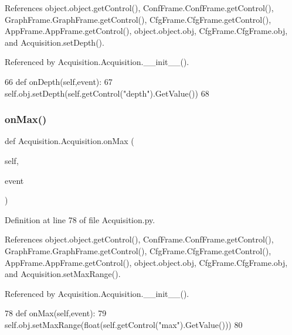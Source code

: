 References object.\+object.\+get\+Control(), Conf\+Frame.\+Conf\+Frame.\+get\+Control(), Graph\+Frame.\+Graph\+Frame.\+get\+Control(), Cfg\+Frame.\+Cfg\+Frame.\+get\+Control(), App\+Frame.\+App\+Frame.\+get\+Control(), object.\+object.\+obj, Cfg\+Frame.\+Cfg\+Frame.\+obj, and Acquisition.\+set\+Depth().



Referenced by Acquisition.\+Acquisition.\+\_\+\+\_\+init\+\_\+\+\_\+().


\begin{DoxyCode}
66     \textcolor{keyword}{def }onDepth(self,event):
67         self.obj.setDepth(self.getControl(\textcolor{stringliteral}{"depth"}).GetValue()) 
68 
\end{DoxyCode}
\mbox{\label{classAcquisition_1_1Acquisition_ad744ff797e84b6e5f785c24d44144697}} 
\subsubsection{\texorpdfstring{on\+Max()}{onMax()}}
{\footnotesize\ttfamily def Acquisition.\+Acquisition.\+on\+Max (\begin{DoxyParamCaption}\item[{}]{self,  }\item[{}]{event }\end{DoxyParamCaption})}



Definition at line 78 of file Acquisition.\+py.



References object.\+object.\+get\+Control(), Conf\+Frame.\+Conf\+Frame.\+get\+Control(), Graph\+Frame.\+Graph\+Frame.\+get\+Control(), Cfg\+Frame.\+Cfg\+Frame.\+get\+Control(), App\+Frame.\+App\+Frame.\+get\+Control(), object.\+object.\+obj, Cfg\+Frame.\+Cfg\+Frame.\+obj, and Acquisition.\+set\+Max\+Range().



Referenced by Acquisition.\+Acquisition.\+\_\+\+\_\+init\+\_\+\+\_\+().


\begin{DoxyCode}
78     \textcolor{keyword}{def }onMax(self,event):
79         self.obj.setMaxRange(float(self.getControl(\textcolor{stringliteral}{"max"}).GetValue()))  
80 
\end{DoxyCode}
\mbox{\label{classAcquisition_1_1Acquisition_aeb3c0ebfb598e5b1c03710574826108c}} 
